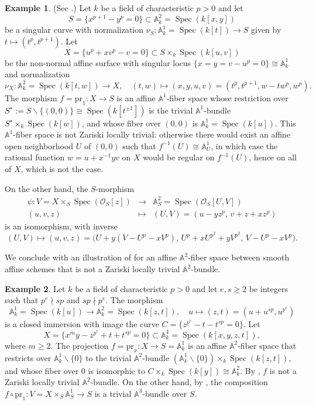 \documentclass[10pt]{amsart}
\renewcommand{\AA}{\mathbb{A}}
\newcommand{\Spec}{\operatorname{Spec}}
\renewcommand{\setminus}{\smallsetminus}
\numberwithin{equation}{section} %
\theoremstyle{plain}
\theoremstyle{definition}
\newtheorem{example}[example]{Example}
\theoremstyle{remark}
\begin{document}
\begin{example}\label{ex:Hamann-example}
(See \cite{Ha75}.) Let $k$ be a field of characteristic $p>0$ and let
\[
S=\{x^{p+1}-y^p=0\}\subset \AA^2_k=\Spec(k[x,y])
\]
be a singular curve with normalization $\nu_S:\AA^1_k=\Spec(k[t])\to S$ given by $t\mapsto (t^p,t^{p+1})$. Let
\[
X=\{u^p+xv^p-v=0\}\subset S\times_k \Spec(k[u,v])
\]
be the non-normal affine surface with singular locus $\{x=y=v-u^p=0\}\cong \AA^1_k$ and normalization
\[
\nu_X:\AA^2_k=\Spec(k[t,w])\to X,\quad (t,w)\mapsto (x,y,u,v)=(t^p,t^{p+1},w-tw^p,w^p).
\]
The morphism $f=\mathrm{pr}_1:X\to S$ is an affine $\AA^1$-fiber space whose restriction over $S^\star:=S\setminus\{(0,0)\}\cong \Spec(k[t^{\pm 1}])$ is the trivial $\AA^1$-bundle $S^\star\times_k\Spec(k[w])$, and whose fiber over $(0,0)$ is $\AA^1_k=\Spec(k[u])$. This $\AA^1$-fiber space is not Zariski locally trivial: otherwise there would exist an affine open neighborhood $U$ of $(0,0)$ such that $f^{-1}(U)\cong \AA^1_U$, in which case the rational function $w=u+x^{-1}yv$ on $X$ would be regular on $f^{-1}(U)$, hence on all of $X$, which is not the case.

On the other hand, the $S$-morphism
\[
\begin{array}{ccc}
\psi\colon V=X\times_{S}\Spec(\mathcal{O}_{S}[z]) & \to & \AA^2_{S}=\Spec(\mathcal{O}_{S}[U,V])\\
(u,v,z) & \mapsto & (U,V)=(u-yz^{p},\,v+z+xz^{p})
\end{array}
\]
is an isomorphism, with inverse
\[
(U,V)\mapsto (u,v,z)=\bigl(U+y(V-U^p-xV^p),\,U^p+xU^{p^2}+yV^{p^2},\,V-U^p-xV^p\bigr).
\]
\end{example}

We conclude with an illustration of  for an affine $\AA^2$-fiber space between smooth affine schemes that is not a Zariski locally trivial $\AA^2$-bundle.

\begin{example}\label{eg:Asanuma3F}
Let $k$ be a field of characteristic $p>0$ and let $e,s\geq 2$ be integers such that 
$p^e\nmid sp$ and $sp\nmid p^e$. The morphism
\[
\AA^1_k=\Spec(k[u])\to \AA^2_k=\Spec(k[z,t]),\quad u\mapsto (z,t)=(u+u^{sp},u^{p^e})
\]
is a closed immersion with image the curve $C=\{z^{p^e}-t-t^{sp}=0\}$. Let
\[
X=\{x^my-z^{p^e}+t+t^{sp}=0\}\subset \AA^4_{k}=\Spec(k[x,y,z,t]),
\]
where $m\geq 2$. The projection $f=\mathrm{pr}_x:X\to S=\AA^1_k$ is an affine $\AA^2$-fiber space that restricts over $\AA^1_k\setminus\{0\}$ to the trivial $\AA^2$-bundle $(\AA^1_k\setminus\{0\})\times_k\Spec(k[z,t])$, and whose fiber over $0$ is isomorphic to $C\times_k\Spec(k[y])\cong \AA^2_k$.
By \cite[Theorem 5.1]{asanuma1987polynomial}, $f$ is not a Zariski locally trivial $\AA^2$-bundle. On the other hand, by \cite[Theorem 3.4]{asanuma1987polynomial}, the composition $f\circ \mathrm{pr}_1:V=X\times_S \AA^1_S\to S$ is a trivial $\AA^3$-bundle over $S$.
\end{example}
\end{document}
